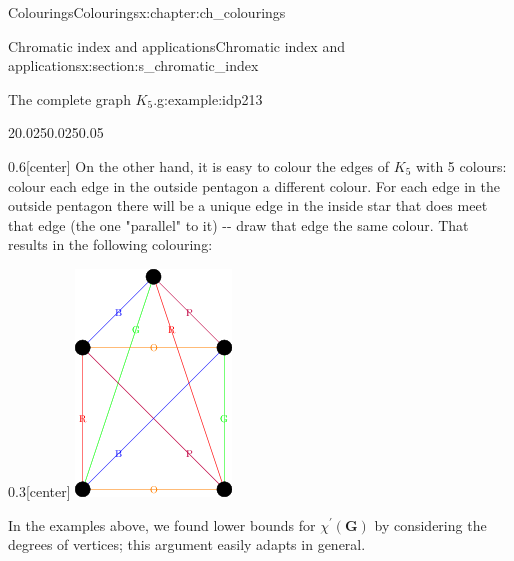 \documentclass[oneside,10pt,]{book}
\numberwithin{equation}{section}
\newcommand{\bfG}{\mathbf{G}}
\begin{document}
\begin{chapterptx}{Colourings}{}{Colourings}{}{}{x:chapter:ch_colourings}
\begin{sectionptx}{Chromatic index and applications}{}{Chromatic index and applications}{}{}{x:section:s_chromatic_index}
\begin{example}{The complete graph \(K_5\).}{g:example:idp213}
\begin{sidebyside}{2}{0.025}{0.025}{0.05}%
\begin{sbspanel}{0.6}[center]%
On the other hand, it is easy to colour the edges of \(K_5\) with 5 colours:  colour each edge in the outside pentagon a different colour.  For each edge in the outside pentagon there will be a unique edge in the inside star that does meet that edge (the one "parallel" to it) -{}-{} draw that edge the same colour.  That results in the following colouring:%
\end{sbspanel}%
\begin{sbspanel}{0.3}[center]%
\includegraphics[width=\linewidth]{images/K5EdgeColouring3.png}
\end{sbspanel}%
\end{sidebyside}%
\end{example}
In the examples above, we found lower bounds for \(\chi^\prime(\bfG)\) by considering the degrees of vertices; this argument easily adapts in general.%

\end{sectionptx}
\end{chapterptx}
\end{document}
